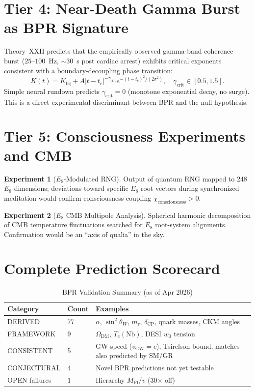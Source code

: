 \documentclass[12pt,oneside]{book}
\theoremstyle{definition}
\newtheorem{experiment}{Experiment}[chapter]
\newcommand{\EEight}{E_8}
\begin{document}
\section{Tier 4: Near-Death Gamma Burst as BPR Signature}

Theory~XXII predicts that the empirically observed gamma-band coherence burst
($25$--$100$~Hz, $\sim 30$~s post cardiac arrest) exhibits critical exponents
consistent with a boundary-decoupling phase transition:
\begin{equation}
  K(t) = K_{\mathrm{bg}} + A|t - t_c|^{-\gamma_{\mathrm{crit}}}
         e^{-(t-t_c)^2/(2\sigma^2)}, \quad
  \gamma_{\mathrm{crit}} \in [0.5, 1.5].
\end{equation}
Simple neural rundown predicts $\gamma_{\mathrm{crit}} = 0$ (monotone exponential
decay, no surge). This is a direct experimental discriminant between BPR and
the null hypothesis.

\section{Tier 5: Consciousness Experiments and CMB}

\begin{experiment}[$E_8$-Modulated RNG]
  Output of quantum RNG mapped to 248 $\EEight$ dimensions; deviations toward
  specific $\EEight$ root vectors during synchronized meditation would confirm
  consciousness coupling $\chi_{\mathrm{consciousness}} > 0$.
\end{experiment}

\begin{experiment}[$E_8$ CMB Multipole Analysis]
  Spherical harmonic decomposition of CMB temperature fluctuations searched for
  $\EEight$ root-system alignments. Confirmation would be an ``axis of qualia''
  in the sky.
\end{experiment}

\section{Complete Prediction Scorecard}

\begin{longtable}{@{}lll@{}}
  \caption{BPR Validation Summary (as of Apr 2026)}\\
  \toprule\textbf{Category} & \textbf{Count} & \textbf{Examples}\\
  \midrule\endfirsthead\midrule\endhead
  DERIVED & 77 & $\alpha$, $\sin^2\theta_W$, $m_\tau$, $\delta_{\mathrm{CP}}$, quark masses, CKM angles\\
  FRAMEWORK & 9 & $\Omega_{\mathrm{DM}}$, $T_c(\mathrm{Nb})$, DESI $w_0$ tension\\
  CONSISTENT & 5 & GW speed ($v_{\mathrm{GW}}=c$), Tsirelson bound, matches also predicted by SM/GR\\
  CONJECTURAL & 4 & Novel BPR predictions not yet testable\\
  OPEN failures & 1 & Hierarchy $M_{\mathrm{Pl}}/v$ (30$\times$ off)\\
  \bottomrule
\end{longtable}
\end{document}
